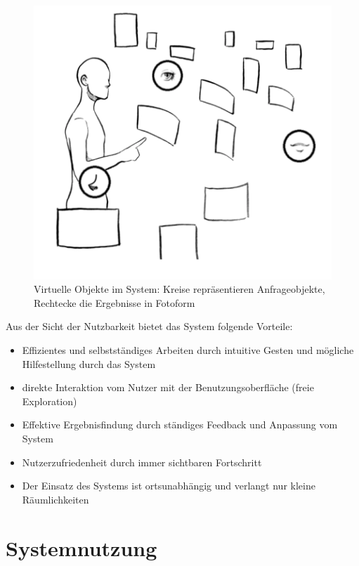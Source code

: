 \documentclass{sigchi-ext}
\begin{document}
\begin{figure}
  \centering
  \includegraphics[width=1\marginparwidth]{figures/system_overview}
  \caption{Virtuelle Objekte im System: Kreise repräsentieren Anfrageobjekte, Rechtecke die Ergebnisse in Fotoform}
  \label{fig:systemoverview}
\end{figure}

Aus der Sicht der Nutzbarkeit bietet das System folgende Vorteile:
\begin{itemize}\compresslist%
\item Effizientes und selbstständiges Arbeiten durch intuitive Gesten
  und mögliche Hilfestellung durch das System
\item direkte Interaktion vom Nutzer mit der Benutzungsoberfläche (freie Exploration)
\item Effektive Ergebnisfindung durch ständiges Feedback und Anpassung vom System
\item Nutzerzufriedenheit durch immer sichtbaren Fortschritt
\item Der Einsatz des Systems ist ortsunabhängig und verlangt nur kleine Räumlichkeiten
\end{itemize}

\section{Systemnutzung}
\end{document}
